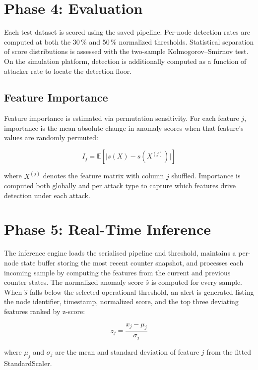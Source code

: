 \documentclass[12pt]{report}
\begin{document}
\section{Phase 4: Evaluation}

Each test dataset is scored using the saved pipeline. Per-node detection rates are computed at both the 30\,\% and 50\,\% normalized thresholds. Statistical separation of score distributions is assessed with the two-sample Kolmogorov--Smirnov test. On the simulation platform, detection is additionally computed as a function of attacker rate to locate the detection floor.

\subsection{Feature Importance}

Feature importance is estimated via permutation sensitivity. For each feature $j$, importance is the mean absolute change in anomaly scores when that feature's values are randomly permuted:

\begin{equation}
I_j = \mathbb{E}\!\left[\bigl|s(X) - s(X^{(j)})\bigr|\right]
\end{equation}

\noindent where $X^{(j)}$ denotes the feature matrix with column $j$ shuffled. Importance is computed both globally and per attack type to capture which features drive detection under each attack.

\section{Phase 5: Real-Time Inference}

The inference engine loads the serialised pipeline and threshold, maintains a per-node state buffer storing the most recent counter snapshot, and processes each incoming sample by computing the features from the current and previous counter states. The normalized anomaly score $\hat{s}$ is computed for every sample. When $\hat{s}$ falls below the selected operational threshold, an alert is generated listing the node identifier, timestamp, normalized score, and the top three deviating features ranked by z-score:

\begin{equation}
z_j = \frac{x_j - \mu_j}{\sigma_j}
\end{equation}

\noindent where $\mu_j$ and $\sigma_j$ are the mean and standard deviation of feature $j$ from the fitted StandardScaler.
\end{document}
